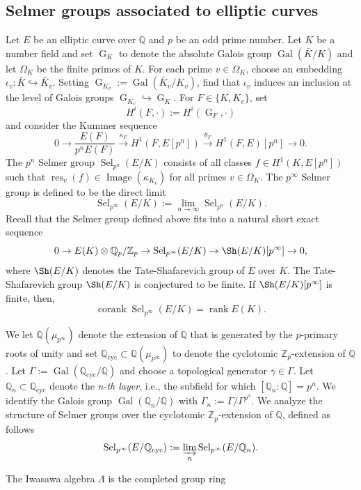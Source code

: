 \documentclass[12pt]{amsart}
\newcommand{\Z}{\mathbb{Z}}
\newcommand{\Q}{\mathbb{Q}}
\newcommand{\op}[1]{\operatorname{#1}}
\numberwithin{equation}{section}
\begin{document}
\subsection{Selmer groups associated to elliptic curves}
\par Let $E$ be an elliptic curve over $\Q$ and $p$ be an odd prime number. Let $K$ be a number field and set $\op{G}_K$ to denote the absolute Galois group $\op{Gal}(\bar{K}/K)$ and let $\Omega_K$ be the finite primes of $K$. For each prime $v\in \Omega_K$, choose an embedding $\iota_v: \bar{K}\hookrightarrow \bar{K}_v$. Setting $\op{G}_{K_v}:=\op{Gal}(\bar{K}_v/K_v)$, find that $\iota_v$ induces an inclusion at the level of Galois groups $\op{G}_{K_v}\hookrightarrow \op{G}_K$. For $F\in \{K, K_v\}$, set \[H^i(F, \cdot):=H^i(\op{G}_F, \cdot)\] and consider the Kummer sequence
\[0\rightarrow \frac{E(F)}{p^n E(F)}\xrightarrow{\kappa_F} H^1(F, E[p^n])\xrightarrow{\theta_F} H^1(F, E)[p^n]\rightarrow 0. \]
The $p^n$ Selmer group $\op{Sel}_{p^n} (E/K)$ consists of all classes $f\in H^1(K, E[p^n])$ such that $\op{res}_v(f)\in \op{Image}(\kappa_{K_v})$ for all primes $v\in \Omega_K$. The $p^\infty$ Selmer group is defined to be the direct limit 
\[\op{Sel}_{p^\infty} (E/K):=\lim_{n\rightarrow \infty} \op{Sel}_{p^n} (E/K).\]
Recall that the Selmer group defined above fits into a natural short exact sequence 
\begin{equation}\label{ses selmer}0\rightarrow E(K)\otimes \Q_p/\Z_p\rightarrow \op{Sel}_{p^\infty}(E/K)\rightarrow \Sh(E/K)[p^\infty]\rightarrow 0,\end{equation}
where $\Sh(E/K)$ denotes the Tate-Shafarevich group of $E$ over $K$. The Tate-Shafarevich group $\Sh(E/K)$ is conjectured to be finite. If $\Sh(E/K)[p^\infty]$ is finite, then, 
\[\op{corank} \op{Sel}_{p^\infty} (E/K)=\op{rank} E(K). \]
\par We let $\Q(\mu_{p^\infty})$ denote the extension of $\Q$ that is generated by the $p$-primary roots of unity and set $\Q_{\op{cyc}}\subset \Q(\mu_{p^\infty})$ to denote the cyclotomic $\Z_p$-extension of $\Q$. Let $\Gamma:=\op{Gal}(\Q_{\op{cyc}}/\Q)$ and choose a topological generator $\gamma\in \Gamma$. Let $\Q_n\subset \Q_{\op{cyc}}$ denote the \emph{n-th layer}, i.e., the subfield for which $[\Q_n:\Q]=p^n$. We identify the Galois group $\op{Gal}(\Q_n/\Q)$ with $\Gamma_n:=\Gamma/\Gamma^{p^n}$. We analyze the structure of Selmer groups over the cyclotomic $\Z_p$-extension of $\Q$, defined as follows
\[\op{Sel}_{p^\infty} (E/\Q_{\op{cyc}}):=\varinjlim_n \op{Sel}_{p^\infty} (E/\Q_{n}).\]
\par The Iwasawa algebra $\Lambda$ is the completed group ring 
\end{document}
